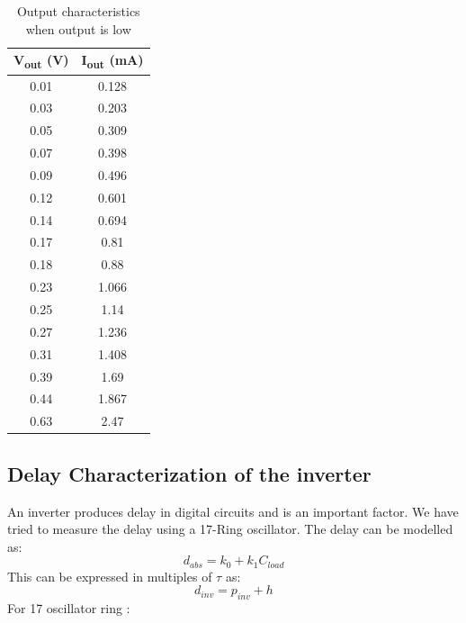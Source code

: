 \documentclass[12pt]{article}
\begin{document}
 
 \begin{table}[!t]
\centering  %
\begin{tabular}{|c | c |}                                                             
\hline  %
V\textsubscript{out} (V) & I\textsubscript{out} (mA) \\  %
\hline  %
0.01 &	0.128\\
0.03 &	0.203\\
0.05 &	0.309\\
0.07 &	0.398\\
0.09 &	0.496\\
0.12 &	0.601\\
0.14 &	0.694\\
0.17 &	0.81\\
0.18 &	0.88\\
0.23 &	1.066\\
0.25 &	1.14\\
0.27 &	1.236\\
0.31 &	1.408\\
0.39 &	1.69\\
0.44  &	1.867\\
0.63 &	2.47\\

\hline  %
\end{tabular}
\caption{Output characteristics when output is low}
\label{table:demotable}
\end{table}
\clearpage
\subsection{ Delay Characterization of the inverter}
An inverter produces delay in digital circuits and is an important factor. We have tried to measure the delay using a 17-Ring oscillator. The delay can be modelled as:
\[d_{abs} = k_{0} + k_{1}C_{load}\]
This can be expressed in multiples of $\tau$ as:
\[d_{inv} = p_{inv} + h\]
 For 17 oscillator ring :
 
\end{document}
